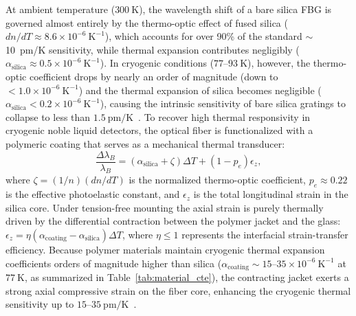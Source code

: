 \documentclass[preprint,11pt]{elsarticle}
\begin{document}
At ambient temperature ($300~\text{K}$), the wavelength shift of a bare silica FBG is governed almost entirely by the thermo-optic effect of fused silica ($dn/dT \approx 8.6 \times 10^{-6}~\text{K}^{-1}$), which accounts for over 90\% of the standard $\sim$10~pm/K sensitivity, while thermal expansion contributes negligibly ($\alpha_{\text{silica}} \approx 0.5 \times 10^{-6}~\text{K}^{-1}$). In cryogenic conditions ($77$--$93~\text{K}$), however, the thermo-optic coefficient drops by nearly an order of magnitude (down to $<1.0 \times 10^{-6}~\text{K}^{-1}$) and the thermal expansion of silica becomes negligible ($\alpha_{\text{silica}} < 0.2 \times 10^{-6}~\text{K}^{-1}$), causing the intrinsic sensitivity of bare silica gratings to collapse to less than $1.5~\text{pm/K}$~\cite{Lupi2008,Salin2008,Rajan2013}. To recover high thermal responsivity in cryogenic noble liquid detectors, the optical fiber is functionalized with a polymeric coating that serves as a mechanical thermal transducer:
\begin{equation}
    \frac{\Delta \lambda_B}{\lambda_B} = (\alpha_{\text{silica}} + \zeta) \Delta T + (1 - p_e) \epsilon_z,
    \label{eq:fbg_coating_strain}
\end{equation}
where $\zeta = (1/n)(dn/dT)$ is the normalized thermo-optic coefficient, $p_e \approx 0.22$ is the effective photoelastic constant, and $\epsilon_z$ is the total longitudinal strain in the silica core. Under tension-free mounting 
the axial strain is purely thermally driven by the differential contraction between the polymer jacket and the glass: $\epsilon_z = \eta (\alpha_{\text{coating}} - \alpha_{\text{silica}}) \Delta T$, where $\eta \le 1$ represents the interfacial strain-transfer efficiency. Because polymer materials maintain cryogenic thermal expansion coefficients orders of magnitude higher than silica ($\alpha_{\text{coating}} \sim 15$--$35 \times 10^{-6}~\text{K}^{-1}$ at $77~\text{K}$, as summarized in Table~\ref{tab:material_cte}), the contracting jacket exerts a strong axial compressive strain on the fiber core, enhancing the cryogenic thermal sensitivity up to $15$--$35~\text{pm/K}$~\cite{Lupi2008,Zhao2007,Rajan2013}.
\end{document}
